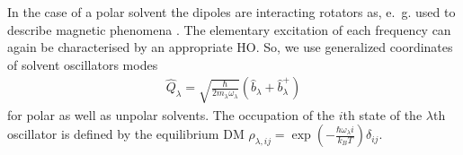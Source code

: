 \documentclass[12pt,twoside,a4paper]{report}
\begin{document}
In the case of a polar solvent
the dipoles are 
interacting rotators 
as, e.~g. 
used 
to describe 
magnetic phenomena \cite{yosi96,tyab67}.
The elementary excitation of each frequency 
can again be
characterised by an appropriate HO.
So, 
we use  generalized coordinates of solvent oscillators
modes
\begin{eqnarray}
\hat Q_\lambda
        =   \sqrt{
                \frac{\hbar}
                     {2m_\lambda\omega_\lambda}}
            (\hat b_\lambda + \hat b^+_\lambda)
\end{eqnarray}
for polar as well as unpolar solvents.
The occupation of the $i$th state of the  $\lambda$th oscillator is defined by the equilibrium
DM $\rho_{\lambda, ij}=\exp{\left(-\frac{\hbar\omega_\lambda i}{k_BT}\right)}\delta_{ij}$.
\end{document}
